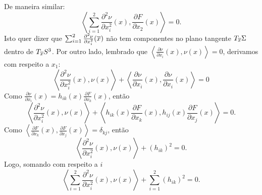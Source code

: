 \begin{demonstracao}
	De maneira similar:
	\begin{equation*}
	\left\langle \sum_{i=1}^2 \frac{\partial^2 \nu}{\partial x_i^2}(x), \frac{\partial F}{\partial x_2}(x) \right\rangle = 0.
	\end{equation*}
	Isto quer dizer que $\sum_{i=1}^2 \frac{\partial^2 \nu}{\partial x_i^2}(\overline{x})$ não tem componentes no plano tangente $T_{\overline{x}} \Sigma$ dentro de $T_{\overline{x}} S^3$.
	Por outro lado, lembrado que $\left\langle \frac{\partial \nu}{\partial x_i}(x), \nu(x) \right\rangle = 0$, derivamos com respeito a $x_1$:
	\begin{equation*}
	\left\langle \frac{\partial^2 \nu}{\partial x_i^2}(x), \nu(x) \right\rangle + \left\langle \frac{\partial \nu}{\partial x_i}(x), \frac{\partial \nu}{\partial x_i}(x) \right\rangle = 0
	\end{equation*}	
	Como $\frac{\partial \nu}{\partial x_i}(x) = h_{ik}(x) \frac{\partial F}{\partial x_k}(x)$, então
	\begin{equation*}
	\left\langle \frac{\partial^2 \nu}{\partial x_i^2}(x), \nu(x) \right\rangle + \left\langle h_{ik}(x) \frac{\partial F}{\partial x_k}(x), h_{ij}(x) \frac{\partial F}{\partial x_j}(x)  \right\rangle = 0.
	\end{equation*}	
	Como $\left\langle \frac{\partial F}{\partial x_k}(x), \frac{\partial F}{\partial x_j}(x) \right\rangle = \delta_{kj}$, então
	\begin{equation*}
	\left\langle \frac{\partial^2 \nu}{\partial x_i^2}(x), \nu(x) \right\rangle + (h_{ik})^2 = 0.
	\end{equation*}	
	Logo, somando com respeito a $i$
	\begin{equation*}
	\left\langle \sum_{i=1}^2 \frac{\partial^2 \nu}{\partial x_i^2}(x), \nu(x) \right\rangle + \sum_{i=1}^2 (h_{ik})^2 = 0.

\end{equation*}
\end{demonstracao}
